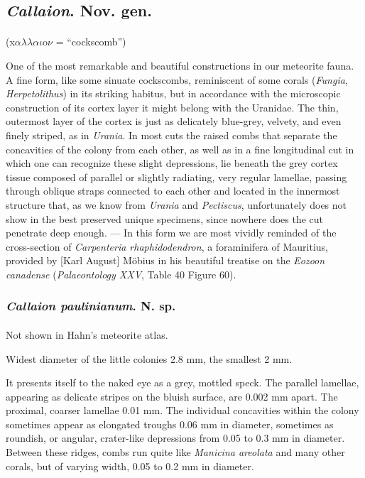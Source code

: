 \documentclass[a4paper, 12pt, oneside]{article}
\begin{document}
\subsection{\emph{Callaion}. Nov. gen.}
\paragraph{}
(x$\alpha\lambda\lambda\alpha\iota$o$\nu$ = ``cockscomb'')%

One of the most remarkable and beautiful constructions in our meteorite fauna. A fine form, like some sinuate cockscombs, reminiscent of some corals (\emph{Fungia}, \emph{Herpetolithus}) in its striking habitus, but in accordance with the microscopic construction of its cortex layer it might belong with the Uranidae. The thin, outermost layer of the cortex is just as delicately blue-grey, velvety, and even finely striped, as in \emph{Urania}. In most cuts the raised combs that separate the concavities of the colony from each other, as well as in a fine longitudinal cut in which one can recognize these slight depressions, lie beneath the grey cortex tissue composed of parallel or slightly radiating, very regular lamellae, passing through oblique straps connected to each other and located in the innermost structure that, as we know from \emph{Urania} and \emph{Pectiscus}, unfortunately does not show in the best preserved unique specimens, since nowhere does the cut penetrate deep enough. --- In this form we are most vividly reminded of the cross-section of \emph{Carpenteria rhaphidodendron}, a foraminifera of Mauritius, provided by [Karl August] Möbius in his beautiful treatise on the \emph{Eozoon canadense} (\emph{Palaeontology XXV}, Table 40 Figure 60).
\subsubsection{\emph{Callaion paulinianum}. N. sp.}
\paragraph{}
Not shown in Hahn's meteorite atlas.

Widest diameter of the little colonies 2.8 mm, the smallest 2 mm.

It presents itself to the naked eye as a grey, mottled speck. The parallel lamellae, appearing as delicate stripes on the bluish surface, are 0.002 mm apart. The proximal, coarser lamellae 0.01 mm. The individual concavities within the colony sometimes appear as elongated troughs 0.06 mm in diameter, sometimes as roundish, or angular, crater-like depressions from 0.05 to 0.3 mm in diameter. Between these ridges, combs run quite like \emph{Manicina areolata} and many other corals, but of varying width, 0.05 to 0.2 mm in diameter.
\end{document}
